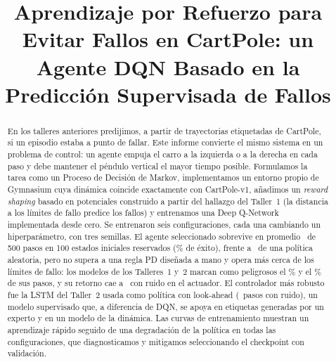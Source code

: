 \documentclass[conference]{IEEEtran}
\begin{document}
\title{Aprendizaje por Refuerzo para Evitar Fallos en CartPole: un Agente DQN Basado en la Predicción Supervisada de Fallos}

\author{
\and
{}
\and
{}
}

\maketitle

\begin{abstract}
En los talleres anteriores predijimos, a partir de trayectorias etiquetadas de CartPole,
si un episodio estaba a punto de fallar. Este informe convierte el mismo sistema en un
problema de control: un agente empuja el carro a la izquierda o a la derecha en cada paso
y debe mantener el péndulo vertical el mayor tiempo posible. Formulamos la tarea como un
Proceso de Decisión de Markov, implementamos un entorno propio de Gymnasium cuya dinámica
coincide exactamente con CartPole-v1, añadimos un \emph{reward shaping} basado en
potenciales construido a partir del hallazgo del Taller~1 (la distancia a los límites de
fallo predice los fallos) y entrenamos una Deep Q-Network implementada desde cero. Se
entrenaron seis configuraciones, cada una cambiando un hiperparámetro, con tres semillas.
El agente seleccionado sobrevive en promedio \TestDQNMean\ de 500 pasos en 100 estados
iniciales reservados (\TestDQNSuccess\% de éxito), frente a \TestRandMean\ de una política
aleatoria, pero no supera a una regla PD diseñada a mano y opera más cerca de los límites
de fallo: los modelos de los Talleres~1 y~2 marcan como peligrosos el \TestDQNDanger\% y el
\TestDQNDangerWTwo\% de sus pasos, y su retorno cae a \NoisyDQNMean\ con ruido en el
actuador. El controlador más robusto fue la LSTM del Taller~2 usada como política con
look-ahead (\NoisyWTwoMean\ pasos con ruido), un modelo supervisado que, a diferencia de
DQN, se apoya en etiquetas generadas por un experto y en un modelo de la dinámica. Las curvas de
entrenamiento muestran un aprendizaje rápido seguido de una degradación de la política en
todas las configuraciones, que diagnosticamos y mitigamos seleccionando el checkpoint con
validación.
\end{abstract}
\end{document}
